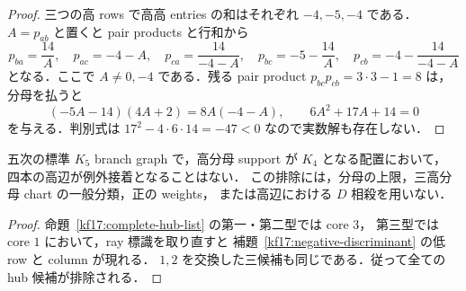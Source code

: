 \begin{proof}
三つの高 rows で高高 entries の和はそれぞれ $-4,-5,-4$ である．
$A=p_{ab}$ と置くと pair products と行和から
\[
 p_{ba}=\frac{14}{A},\quad
 p_{ac}=-4-A,\quad
 p_{ca}=\frac{14}{-4-A},\quad
 p_{bc}=-5-\frac{14}{A},\quad
 p_{cb}=-4-\frac{14}{-4-A}
\]
となる．ここで $A\ne0,-4$ である．残る pair product
$p_{bc}p_{cb}=3\cdot3-1=8$ は，分母を払うと
\[
 (-5A-14)(4A+2)=8A(-4-A),
 \qquad 6A^2+17A+14=0
\]
を与える．判別式は $17^2-4\cdot6\cdot14=-47<0$ なので実数解も存在しない．
\end{proof}

\begin{theorem}
\label{kf17:no-four-exceptions}
五次の標準 $K_5$ branch graph で，高分母 support が $K_4$ となる配置において，
四本の高辺が例外接着となることはない．
この排除には，分母の上限，三高分母 chart の一般分類，正の weights，
または高辺における $D$ 相殺を用いない．
\end{theorem}

\begin{proof}
命題~\ref{kf17:complete-hub-list} の第一・第二型では core $3$，
第三型では core $1$ において，ray 標識を取り直すと
補題~\ref{kf17:negative-discriminant} の低 row と column が現れる．
$1,2$ を交換した三候補も同じである．従って全ての hub 候補が排除される．
\end{proof}
